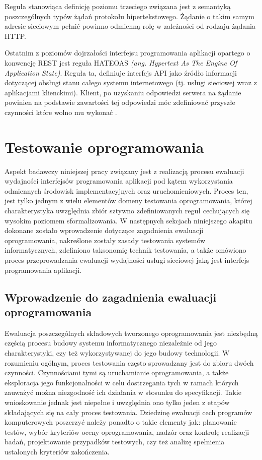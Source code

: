 Reguła stanowiąca definicję poziomu trzeciego związana jest z semantyką poszczególnych typów żądań protokołu hipertekstowego. Żądanie o takim samym adresie sieciowym pełnić powinno odmienną rolę w zależności od rodzaju żądania HTTP.

Ostatnim z poziomów dojrzałości interfejsu programowania aplikacji opartego o konwencję REST jest reguła HATEOAS \textit{(ang. Hypertext As The Engine Of Application State)}. Reguła ta, definiuje interfejs API jako źródło informacji dotyczącej obsługi stanu całego systemu internetowego (tj. usługi sieciowej wraz z aplikacjami klienckimi). Klient, po uzyskaniu odpowiedzi serwera na żądanie powinien na podstawie zawartości tej odpowiedzi móc zdefiniować przyszłe czynności które wolno mu wykonać \cite{webber2010rest}.  

\section{Testowanie oprogramowania}
Aspekt badawczy niniejszej pracy związany jest z realizacją procesu ewaluacji wydajności interfejsów programowania aplikacji pod kątem wykorzystania odmiennych środowisk implementacyjnych oraz uruchomieniowych. Proces ten, jest tylko jednym z wielu elementów domeny testowania oprogramowania, której charakterystyka uwzględnia zbiór sztywno zdefiniowanych reguł cechujących się wysokim poziomem sformalizowania. W następnych sekcjach niniejszego akapitu dokonane zostało wprowadzenie dotyczące zagadnienia ewaluacji oprogramowania, nakreślone zostały zasady testowania systemów informatycznych, zdefiniono taksonomię technik testowania, a także omówiono proces przeprowadzania ewaluacji wydajności usługi sieciowej jaką jest interfejs programowania aplikacji. 
\subsection*{Wprowadzenie do zagadnienia ewaluacji oprogramowania}
Ewaluacja poszczególnych składowych tworzonego oprogramowania jest niezbędną częścią procesu budowy systemu informatycznego niezależnie od jego charakterystyki, czy też wykorzystywanej do jego budowy technologii. W rozumieniu ogólnym, proces testowania często sprowadzany jest do zbioru dwóch czynności. Czynnościami tymi są uruchamianie oprogramowania, a także eksploracja jego funkcjonalności w celu dostrzegania tych w ramach których zauważyć można niezgodność ich działania w stosunku do specyfikacji. Takie wnioskowanie jednak jest niepełne i uwzględnia ono tylko jeden z etapów składających się na cały proces testowania. Dziedzinę ewaluacji cech programów komputerowych poszerzyć należy ponadto o takie elementy jak: planowanie testów, wybór kryteriów oceny oprogramowania, nadzór oraz kontrolę realizacji badań, projektowanie przypadków testowych, czy też analizę spełnienia ustalonych kryteriów zakończenia.


